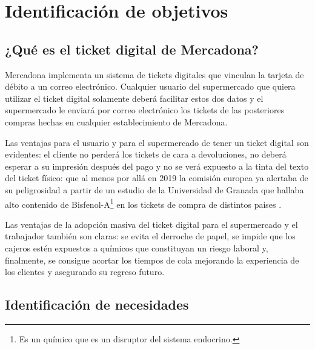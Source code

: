 \documentclass[a4paper,12pt]{report}
\begin{document}
	
	\tableofcontents
	\newpage
	
	
	
	
	
	
	
	
	\begingroup
	\setlength{\parskip}{.7em}
	
	
	
	
	\chapter{Identificación de objetivos}

		\section{¿Qué es el ticket digital de Mercadona?}
		
		Mercadona implementa un sistema de tickets digitales que vinculan la tarjeta de débito a un correo electrónico. Cualquier usuario del supermercado que quiera utilizar el ticket digital solamente deberá facilitar estos dos datos y el supermercado le enviará por correo electrónico los tickets de las posteriores compras hechas en cualquier establecimiento de Mercadona.
		
		Las ventajas para el usuario y para el supermercado de tener un ticket digital son evidentes: el cliente no perderá los tickets de cara a devoluciones, no deberá esperar a su impresión después del pago y no se verá expuesto a la tinta del texto del ticket físico: que al menos por allá en 2019 la comisión europea ya alertaba de su peligrosidad \cite{EU_Parliament_2019} a partir de un estudio de la Universidad de Granada que hallaba alto contenido de Bisfenol-A\footnote{Es un químico que es un disruptor del sistema endocrino.} en los tickets de compra de distintos paises \cite{Molina-Molina2019}\cite{CanalUGR}.
		
		Las ventajas de la adopción masiva del ticket digital para el supermercado y el trabajador también son claras: se evita el derroche de papel, se impide que los cajeros estén expuestos a químicos que constituyan un riesgo laboral y, finalmente, se consigue acortar los tiempos de cola mejorando la experiencia de los clientes y asegurando su regreso futuro.
		
		
		
		\section{Identificación de necesidades}
		\label{section:identificacionNecesidades}
		
\end{document}
